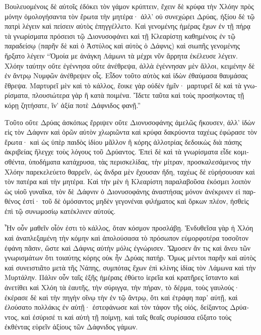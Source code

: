 \documentclass{book}
\begin{document}
\begin{pairs}
\begin{Leftside}
\begin{greek}
  Βουλευομένοις δὲ αὐτοῖς ἐδόκει τὸν γάμον κρύπτειν, ἔχειν δὲ κρύφα τὴν Χλόην πρὸς μόνην ὁμολογήσαντα τὸν ἔρωτα τὴν μητέρα· ἀλλ’ οὐ συνεχώρει Δρύας, ἠξίου δὲ τῷ πατρὶ λέγειν καὶ πείσειν αὐτὸς ἐπηγγέλλετο.  Καὶ γενομένης ἡμέρας ἔχων ἐν τῇ πήρᾳ τὰ γνωρίσματα πρόσεισι τῷ Διονυσοφάνει καὶ τῇ Κλεαρίστῃ καθημένοις ἐν τῷ παραδείσῳ (παρῆν δὲ καὶ ὁ Ἀστύλος καὶ αὐτὸς ὁ Δάφνις) καὶ σιωπῆς γενομένης ἤρξατο λέγειν  “Ὁμοία με ἀνάγκη Λάμωνι τὰ μέχρι νῦν ἄρρητα ἐκέλευσε λέγειν. Χλόην ταύτην οὔτε ἐγέννησα οὔτε ἀνέθρεψα, ἀλλὰ ἐγέννησαν μὲν ἄλλοι, κειμένην δὲ ἐν ἄντρῳ Νυμφῶν ἀνέθρεψεν οἶς.  Εἶδον τοῦτο αὐτὸς καὶ ἰδὼν ἐθαύμασα θαυμάσας ἔθρεψα. Μαρτυρεῖ μὲν καὶ τὸ κάλλος, ἔοικε γὰρ οὐδὲν ἡμῖν· μαρτυρεῖ δὲ καὶ τὰ γνωρίσματα, πλουσιώτερα γὰρ ἢ κατὰ ποιμένα. Ἴδετε ταῦτα καὶ τοὺς προσήκοντας τῇ κόρῃ ζητήσατε, ἵν’ ἀξία ποτὲ Δάφνιδος φανῇ.”
\pend


  Τοῦτο οὔτε Δρύας ἀσκόπως ἔρριψεν οὔτε Διονυσοφάνης ἀμελῶς ἤκουσεν, ἀλλ’ ἰδὼν εἰς τὸν Δάφνιν καὶ ὁρῶν αὐτὸν χλωριῶντα καὶ κρύφα δακρύοντα ταχέως ἐφώρασε τὸν ἔρωτα· καὶ ὡς ὑπὲρ παιδὸς ἰδίου μᾶλλον ἢ κόρης ἀλλοτρίας δεδοικὼς διὰ πάσης ἀκριβείας ἤλεγχε τοὺς λόγους τοῦ Δρύαντος.  Ἐπεὶ δὲ καὶ τὰ γνωρίσματα εἶδε κομισθέντα, ὑποδήματα κατάχρυσα, τὰς περισκελίδας, τὴν μίτραν, προσκαλεσάμενος τὴν Χλόην παρεκελεύετο θαρρεῖν, ὡς ἄνδρα μὲν ἔχουσαν ἤδη, ταχέως δὲ εὑρήσουσαν καὶ τὸν πατέρα καὶ τὴν μητέρα.  Καὶ τὴν μὲν ἡ Κλεαρίστη παραλαβοῦσα ἐκόσμει λοιπὸν ὡς υἱοῦ γυναῖκα, τὸν δὲ Δάφνιν ὁ Διονυσοφάνης ἀναστήσας μόνον ἀνέκρινεν εἰ παρθένος ἐστί· τοῦ δὲ ὀμόσαντος μηδὲν γεγονέναι φιλήματος καὶ ὅρκων πλέον, ἡσθεὶς ἐπὶ τῷ συνωμοσίῳ κατέκλινεν αὐτούς.
\pend


  Ἦν οὖν μαθεῖν οἷόν ἐστι τὸ κάλλος, ὅταν κόσμον προσλάβῃ. Ἐνδυθεῖσα γὰρ ἡ Χλόη καὶ ἀναπλεξαμένη τὴν κόμην καὶ ἀπολούσασα τὸ πρόσωπον εὐμορφοτέρα τοσοῦτον ἐφάνη πᾶσιν, ὥστε καὶ Δάφνις αὐτὴν μόλις ἐγνώρισεν.  Ὤμοσεν ἄν τις καὶ ἄνευ τῶν γνωρισμάτων ὅτι τοιαύτης κόρης οὐκ ἦν Δρύας πατήρ. Ὅμως μέντοι παρῆν καὶ αὐτὸς καὶ συνειστιᾶτο μετὰ τῆς Νάπης, συμπότας ἔχων ἐπὶ κλίνης ἰδίας τὸν Λάμωνα καὶ τὴν Μυρτάλην.  Πάλιν οὖν ταῖς ἑξῆς ἡμέραις ἐθύετο ἱερεῖα καὶ κρατῆρες ἵσταντο καὶ ἀνετίθει καὶ Χλόη τὰ ἑαυτῆς, τὴν σύριγγα, τὴν πήραν, τὸ δέρμα, τοὺς γαυλούς· ἐκέρασε δὲ καὶ τὴν πηγὴν οἴνῳ τὴν ἐν τῷ ἄντρῳ, ὅτι καὶ ἐτράφη παρ’ αὐτῇ, καὶ ἐλούσατο πολλάκις ἐν αὐτῇ·  ἐστεφάνωσε καὶ τὸν τάφον τῆς οἰός, δείξαντος Δρύαντος, καὶ ἐσύρισέ τι καὶ αὐτὴ τῇ ποίμνῃ, καὶ ταῖς θεαῖς συρίσασα εὔξατο τοὺς ἐκθέντας εὑρεῖν ἀξίους τῶν Δάφνιδος γάμων.
\pend



\end{greek}
\end{Leftside}
\end{pairs}
\end{document}
